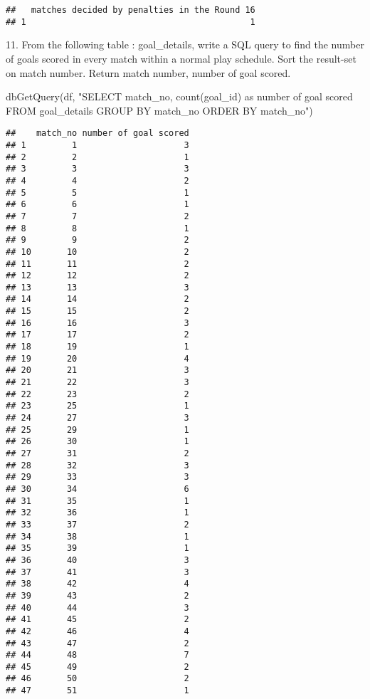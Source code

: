 \documentclass[
]{article}
\newenvironment{Shaded}{\begin{snugshade}}{\end{snugshade}}
\newcommand{\FunctionTok}[1]{\textcolor[rgb]{0.00,0.00,0.00}{#1}}
\newcommand{\NormalTok}[1]{#1}
\newcommand{\StringTok}[1]{\textcolor[rgb]{0.31,0.60,0.02}{#1}}
\begin{document}
\begin{verbatim}
##   matches decided by penalties in the Round 16
## 1                                            1
\end{verbatim}

11. From the following table : goal\_details, write a SQL query to find
the number of goals scored in every match within a normal play schedule.
Sort the result-set on match number. Return match number, number of goal
scored.

\begin{Shaded}
\begin{Highlighting}[]
\FunctionTok{dbGetQuery}\NormalTok{(df, }\StringTok{"SELECT match\_no, }
\StringTok{                       count(goal\_id) as \textquotesingle{}number of goal scored\textquotesingle{}}
\StringTok{                FROM goal\_details}
\StringTok{                GROUP BY match\_no}
\StringTok{                ORDER BY match\_no"}\NormalTok{)}
\end{Highlighting}
\end{Shaded}

\begin{verbatim}
##    match_no number of goal scored
## 1         1                     3
## 2         2                     1
## 3         3                     3
## 4         4                     2
## 5         5                     1
## 6         6                     1
## 7         7                     2
## 8         8                     1
## 9         9                     2
## 10       10                     2
## 11       11                     2
## 12       12                     2
## 13       13                     3
## 14       14                     2
## 15       15                     2
## 16       16                     3
## 17       17                     2
## 18       19                     1
## 19       20                     4
## 20       21                     3
## 21       22                     3
## 22       23                     2
## 23       25                     1
## 24       27                     3
## 25       29                     1
## 26       30                     1
## 27       31                     2
## 28       32                     3
## 29       33                     3
## 30       34                     6
## 31       35                     1
## 32       36                     1
## 33       37                     2
## 34       38                     1
## 35       39                     1
## 36       40                     3
## 37       41                     3
## 38       42                     4
## 39       43                     2
## 40       44                     3
## 41       45                     2
## 42       46                     4
## 43       47                     2
## 44       48                     7
## 45       49                     2
## 46       50                     2
## 47       51                     1
\end{verbatim}
\end{document}

